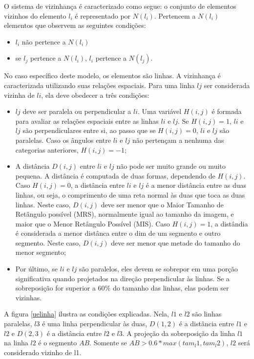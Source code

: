 O sistema de vizinhança é caracterizado como segue: o conjunto de elementos vizinhos do elemento $l_i$ é representado por $N(l_i)$. Pertencem a $N(l_i)$ elementos que observem as seguintes condições:
\begin{itemize}
\item $l_i$ não pertence a $N(l_i)$ 
\item se $l_j$ pertence a $N(l_i)$, $l_i$ pertence a $N(l_j)$.
\end{itemize}
No caso específico deste modelo, os elementos são linhas. A vizinhança é caracterizada utilizando suas relações espaciais. Para uma linha $lj$ ser considerada vizinha de $li$, ela deve obedecer a três condições:
	\begin{itemize}
\item $lj$ deve ser paralela ou perpendicular a $li$. Uma variável $H(i,j)$ é formada para avaliar as relações espaciais entre as linhas $li$ e $lj$. Se $H(i,j) = 1$, $li$ e $lj$ são perpendiculares entre si, ao passo que se $H(i,j) = 0$, $li$ e $lj$ são paralelas. Caso os ângulos entre $li$ e $lj$ não pertençam a nenhuma das categorias anteriores, $H(i,j) = -1$;
\item A distância $D(i,j)$ entre $li$ e $lj$ não pode ser muito grande ou muito pequena. A distância é computada de duas formas, dependendo de $H(i,j)$. Caso $H(i,j) = 0$, a distância entre $li$ e $lj$ é a menor distância entre as duas linhas, ou seja, o comprimento de uma reta normal às duas que toca as duas linhas. Neste caso, $D(i,j)$ deve ser menor que o Maior Tamanho de Retângulo possível (MRS), normalmente igual ao tamanho da imagem, e maior que o Menor Retângulo Possível (MIS).  Caso $H(i,j) = 1$, a distândia é considerada a menor distânca entre o dim de um segmento e outro segmento. Neste caso, $D(i,j)$ deve ser menor que metade do tamanho do menor segmento;
\item Por último, se $li$ e $lj$ são paralelos, eles devem se sobrepor em uma porção significativa quando projetados na direção prependicular às linhas. Se a sobreposição for superior a 60\% do tamanho das linhas, elas podem ser vizinhas. 
\end{itemize}
 A figura \ref{uelinha} ilustra as condições explicadas. Nela, $l1$ e $l2$ são linhas paralelas, $l3$ é uma linha perpendicular às duas, $D(1,2)$ é a distância entre $l1$ e $l2$ e $D(2,3)$ é a distância entre $l2$ e $l3$. A projeção da sobreposição da linha $l1$ na linha $l2$ é o segmento $AB$. Somente se $AB > 0.6*max(tam_l1,tam_l2)$, $l2$ será considerado vizinho de l1.

